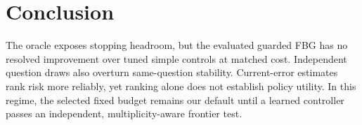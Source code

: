 \section{Conclusion}
\label{sec:conclusion}
The oracle exposes stopping headroom, but the evaluated guarded FBG has no resolved
improvement over tuned simple controls at matched cost. Independent question draws
also overturn same-question stability. Current-error estimates rank risk more
reliably, yet ranking alone does not establish policy utility. In this regime,
the selected fixed budget remains our default until a learned controller
passes an independent, multiplicity-aware frontier test.
